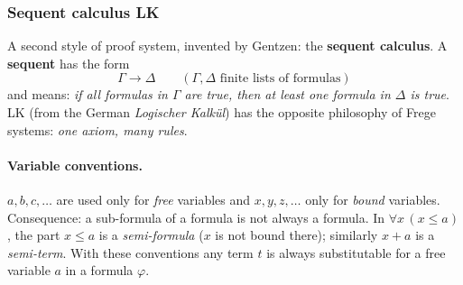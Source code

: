 \begin{center}
\end{center}

\subsubsection{Sequent calculus LK}

A second style of proof system, invented by Gentzen: the \textbf{sequent calculus}. A
\textbf{sequent} has the form
\[ \Gamma \to \Delta \qquad (\Gamma, \Delta \text{ finite lists of formulas}) \]
and means: \emph{if all formulas in $\Gamma$ are true, then at least one formula in
$\Delta$ is true}. LK (from the German \emph{Logischer Kalk\"ul}) has the opposite
philosophy of Frege systems: \emph{one axiom, many rules}.

\paragraph{Variable conventions.} $a, b, c, \ldots$ are used only for \emph{free}
variables and $x, y, z, \ldots$ only for \emph{bound} variables. Consequence: a
sub-formula of a formula is not always a formula. In $\forall x\,(x \leq a)$, the part
$x \leq a$ is a \emph{semi-formula} ($x$ is not bound there); similarly $x + a$ is a
\emph{semi-term}. With these conventions any term $t$ is always substitutable for a free
variable $a$ in a formula $\varphi$.

